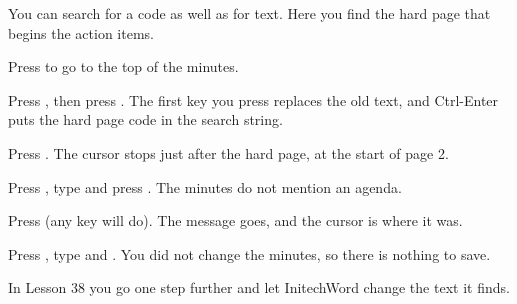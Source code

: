 You can search for a code as well as for text.  Here you find the hard page
that begins the action items.
\begin{WPSteps}
\item Press  to go to the top of the minutes.
\item Press , then press .
The first key you press replaces the old text, and Ctrl-Enter puts the hard
page code in the search string.
\end{WPSteps}
\begin{WPSteps}[resume]
\item Press .  The cursor stops just after the hard page, at
the start of page 2.
\end{WPSteps}

\begin{WPSteps}
\item Press , type  and press
.  The minutes do not mention an agenda.
\end{WPSteps}
\begin{WPSteps}[resume]
\item Press  (any key will do).  The message goes, and the
cursor is where it was.
\item Press , type  and .  You did
not change the minutes, so there is nothing to save.
\end{WPSteps}
\EndReplay
In Lesson 38 you go one step further and let InitechWord change the text it
finds.
